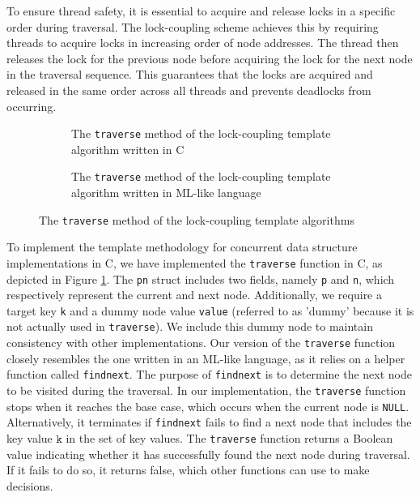 \documentclass[a4paper,UKenglish,cleveref, autoref, thm-restate]{lipics-v2021}
\begin{document}
To ensure thread safety, it is essential to acquire and release locks in a specific order during traversal. The lock-coupling scheme achieves this by requiring threads to acquire locks in increasing order of node addresses. The thread then releases the lock for the previous node before acquiring the lock for the next node in the traversal sequence. This guarantees that the locks are acquired and released in the same order across all threads and prevents deadlocks from occurring.

\begin{figure}[ht]
	\begin{subfigure}[t]{0.48\textwidth}
		 
		\caption{The \lstinline{traverse} method of the lock-coupling template algorithm written in C}
		\label{traverse_lock_a}
	\end{subfigure}\qquad
	\begin{subfigure}[t]{0.45\textwidth}
		 
		\caption{The \lstinline{traverse} method of the lock-coupling template algorithm written in ML-like language \cite{krishna2019compositional}}
		\label{traverse_lock_b}	
	\end{subfigure}
	\caption{The \lstinline{traverse} method of the lock-coupling template algorithms}
	\label{traverse_lock}
\end{figure}

To implement the template methodology for concurrent data structure implementations in C, we have implemented the \lstinline{traverse} function in C, as depicted in Figure \ref{traverse_lock_a}. The \lstinline{pn} struct includes two fields, namely \lstinline{p} and \lstinline{n}, which respectively represent the current and next node. Additionally, we require a target key \lstinline{k} and a dummy node value \lstinline{value} (referred to as 'dummy' because it is not actually used in \lstinline{traverse}). We include this dummy node to maintain consistency with other implementations. Our version of the \lstinline{traverse} function closely resembles the one written in an ML-like language, as it relies on a helper function called \lstinline{findnext}. The purpose of \lstinline{findnext} is to determine the next node to be visited during the traversal. In our implementation, the \lstinline{traverse} function stops when it reaches the base case, which occurs when the current node is \lstinline{NULL}. Alternatively, it terminates if \lstinline{findnext} fails to find a next node that includes the key value $\texttt{k}$ in the set of key values. The \lstinline{traverse} function returns a Boolean value indicating whether it has successfully found the next node during traversal. If it fails to do so, it returns false, which other functions can use to make decisions.
\end{document}

